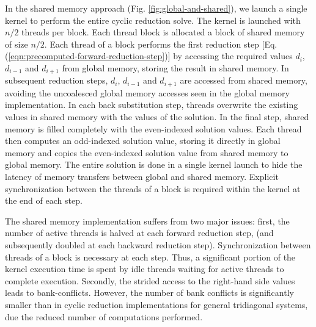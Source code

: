 In the shared memory approach (Fig. \ref{fig:global-and-shared}),
we launch a single kernel to perform the entire
cyclic reduction solve.
The kernel is launched with $n/2$ threads per block.
Each thread block is allocated a block of shared memory of size $n/2$.
Each thread of a block performs the first reduction step
[Eq. (\ref{eqn:precomputed-forward-reduction-step})]
by accessing the required values
$d_i$, $d_{i-1}$ and $d_{i+1}$ from global memory,
storing the result in shared memory.
In subsequent reduction steps,
$d_i$, $d_{i-1}$ and $d_{i+1}$
are accessed from shared memory,
avoiding the uncoalesced global memory accesses
seen in the global memory implementation.
In each back substitution step,
threads overwrite the existing values in shared memory
with the values of the solution.
In the final step,
shared memory is filled completely
with the even-indexed solution values.
Each thread then computes an odd-indexed solution value,
storing it directly in global memory
and copies the even-indexed solution value
from shared memory to global memory.
The entire solution is done in a single kernel launch
to hide the latency of
memory transfers between global and shared memory.
Explicit synchronization between the threads of a block
is required within the kernel at the end of each step.

The shared memory implementation suffers from two major issues:
first, the number of active threads is halved at each forward reduction step,
(and subsequently doubled at each backward reduction step).
Synchronization between threads of a block is necessary at each step.
Thus, a significant portion of the kernel execution time is
spent by idle threads waiting for active threads to complete execution.
Secondly, the strided access to the
right-hand side values leads to bank-conflicts.
However, the number of bank conflicts is significantly smaller
than in cyclic reduction implementations for general tridiagonal systems,
due the reduced number of computations performed.

